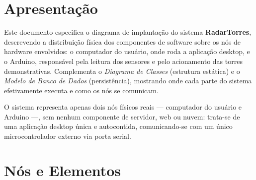%

\section{Apresentação}

Este documento especifica o diagrama de implantação do sistema \textbf{RadarTorres}, descrevendo
a distribuição física dos componentes de software sobre os nós de hardware envolvidos: o
computador do usuário, onde roda a aplicação desktop, e o Arduino, responsável pela leitura dos
sensores e pelo acionamento das torres demonstrativas. Complementa o \emph{Diagrama de Classes}
(estrutura estática) e o \emph{Modelo de Banco de Dados} (persistência), mostrando onde cada
parte do sistema efetivamente executa e como os nós se comunicam.

O sistema representa apenas dois nós físicos reais --- computador do usuário e Arduino ---, sem
nenhum componente de servidor, web ou nuvem: trata-se de uma aplicação desktop única e
autocontida, comunicando-se com um único microcontrolador externo via porta serial.

\section{Nós e Elementos}

